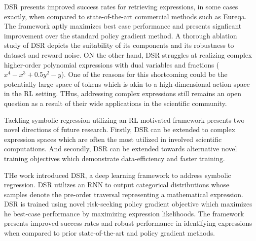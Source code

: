 \documentclass[11pt,letterpaper]{article}
\begin{document}
DSR presents improved success rates for retrieving expressions, in some cases exactly, when compared to state-of-the-art commercial methods such as Eureqa. The framework aptly maximizes best case performance and presents signficant improvement over the standard policy gradient method. A thorough ablation study of DSR depicts the suitability of its components and its robustness to dataset and reward noise. ON the other hand, DSR struggles at realizing complex higher-order polynomial expressions with dual variables and fractions ($x^{4} - x^{3} + 0.5y^{2} - y$). One of the reasons for this shortcoming could be the potentially large space of tokens which is akin to a high-dimensional action space in the RL setting. THus, addressing complex expressions still remains an open question as a result of their wide applications in the scientific community. 

Tackling symbolic regression utilizing an RL-motivated framework presents two novel directions of future research. Firstly, DSR can be extended to complex expression spaces which are often the most utilized in involved scientific computations. And secondly, DSR can be extended towards alternative novel training objectives which demonstrate data-efficiency and faster training. 

THe work introduced DSR, a deep learning framework to address symbolic regression. DSR utilizes an RNN to output categorical distributions whose samples denote the pre-order traversal representing a mathematical expression. DSR is trained using novel risk-seeking policy gradient objective which maximizes he best-case performance by maximizing expression likelihoods. The framework presents improved success rates and robust performance in identifying expressions when compared to prior state-of-the-art and policy gradient methods. 
\end{document}
